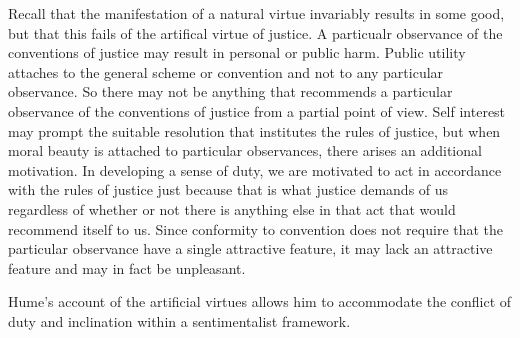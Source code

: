 Recall that the manifestation of a natural virtue invariably results in some good, but that this fails of the artifical virtue of justice. A particualr observance of the conventions of justice may result in personal or public harm. Public utility attaches to the general scheme or convention and not to any particular observance. So there may not be anything that recommends a particular observance of the conventions of justice from a partial point of view. Self interest may prompt the suitable resolution that institutes the rules of justice, but when moral beauty is attached to particular observances, there arises an additional motivation. In developing a sense of duty, we are motivated to act in accordance with the rules of justice just because that is what justice demands of us regardless of whether or not there is anything else in that act that would recommend itself to us. Since conformity to convention does not require that the particular observance have a single attractive feature, it may lack an attractive feature and may in fact be unpleasant.

Hume’s account of the artificial virtues allows him to accommodate the conflict of duty and inclination within a sentimentalist framework.

% 


